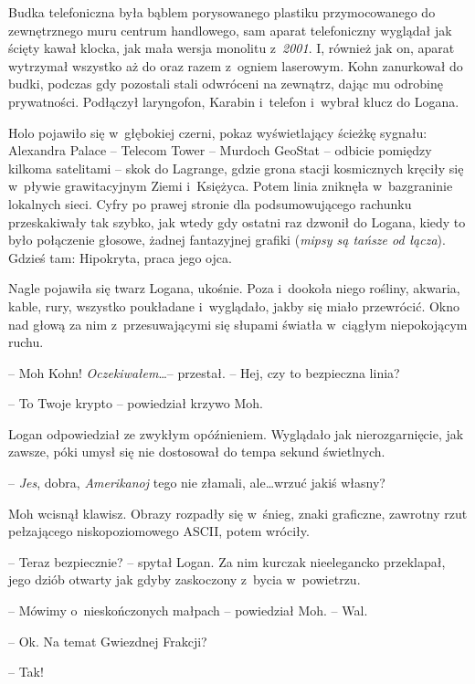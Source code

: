 \documentclass[oneside,polish,11pt,sfheadings]{mwbk}
\begin{document}
Budka telefoniczna była bąblem porysowanego plastiku przymocowanego do
zewnętrznego muru centrum handlowego, sam aparat telefoniczny wyglądał
jak ścięty kawał klocka, jak mała wersja monolitu z~\emph{2001}. I,
również jak on, aparat wytrzymał wszystko aż do oraz razem z~ogniem
laserowym. Kohn zanurkował do budki, podczas gdy pozostali stali
odwróceni na zewnątrz, dając mu odrobinę prywatności. Podłączył
laryngofon, Karabin i~telefon i~wybrał klucz do Logana.

Holo pojawiło się w~głębokiej czerni, pokaz wyświetlający ścieżkę
sygnału: Alexandra Palace -- Telecom Tower -- Murdoch GeoStat -- odbicie
pomiędzy kilkoma satelitami -- skok do Lagrange, gdzie grona stacji
kosmicznych kręciły się w~pływie grawitacyjnym Ziemi i~Księżyca. Potem
linia zniknęła w~bazgraninie lokalnych sieci. Cyfry po prawej stronie
dla podsumowującego rachunku przeskakiwały tak szybko, jak wtedy gdy
ostatni raz dzwonił do Logana, kiedy to było połączenie głosowe, żadnej
fantazyjnej grafiki (\emph{mipsy są tańsze od łącza}). Gdzieś tam:
Hipokryta, praca jego ojca.

Nagle pojawiła się twarz Logana, ukośnie. Poza i~dookoła niego rośliny,
akwaria, kable, rury, wszystko poukładane i~wyglądało, jakby się miało
przewrócić. Okno nad głową za nim z~przesuwającymi się słupami światła w~ciągłym niepokojącym ruchu.

-- Moh Kohn! \emph{Oczekiwałem}\ldots -- przestał. -- Hej, czy to bezpieczna
linia?

-- To Twoje krypto -- powiedział krzywo Moh.

Logan odpowiedział ze zwykłym opóźnieniem. Wyglądało jak
nierozgarnięcie, jak zawsze, póki umysł się nie dostosował do tempa
sekund świetlnych. 

-- \emph{Jes}, dobra, \emph{Amerikanoj} tego nie
złamali, ale\ldots wrzuć jakiś własny?

Moh wcisnął klawisz. Obrazy rozpadły się w~śnieg, znaki graficzne,
zawrotny rzut pełzającego niskopoziomowego ASCII, potem wróciły.

-- Teraz bezpiecznie? -- spytał Logan. Za nim kurczak nieelegancko
przeklapał, jego dziób otwarty jak gdyby zaskoczony z~bycia w~powietrzu.

-- Mówimy o~nieskończonych małpach -- powiedział Moh. -- Wal.

-- Ok. Na temat Gwiezdnej Frakcji?

-- Tak!
\end{document}
